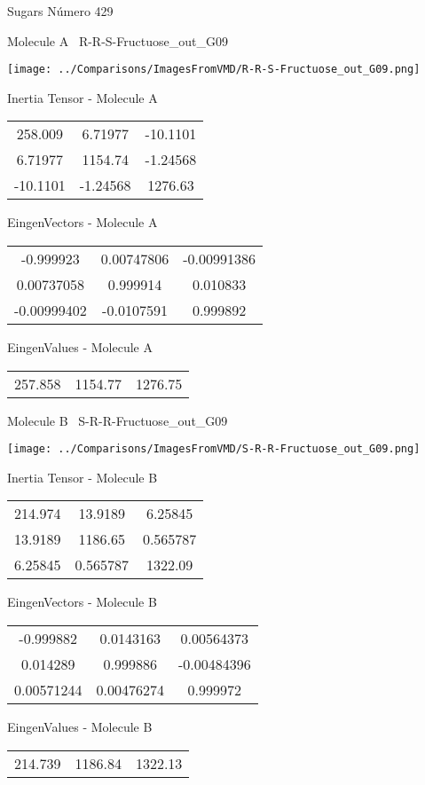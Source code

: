 \vtab[-3cm]
\begin{center}
{\large Sugars \tab Número 429}
\end{center}
\begin{multicols}{2}
\begin{center}

Molecule A \
R-R-S-Fructuose\_out\_G09

\texttt{[image: ../Comparisons/ImagesFromVMD/R-R-S-Fructuose\_out\_G09.png]}

Inertia Tensor - Molecule A \\
\begin{tabular}{|c c c|}
258.009	 & 	6.71977	 & 	-10.1101	 \\
6.71977	 & 	1154.74	 & 	-1.24568	 \\
-10.1101	 & 	-1.24568	 & 	1276.63
\end{tabular}

\vtab
 EingenVectors - Molecule A     \\
\begin{tabular}{|c c c|}
-0.999923	 & 	0.00747806	 & 	-0.00991386	 \\
0.00737058	 & 	0.999914	 & 	0.010833	 \\
-0.00999402	 & 	-0.0107591	 & 	0.999892
\end{tabular}

\vtab
 EingenValues - Molecule A     \\
\begin{tabular}{|c c c|}
257.858	 & 	1154.77	 & 	1276.75	 \\
\end{tabular}
\columnbreak

Molecule B \
S-R-R-Fructuose\_out\_G09

\texttt{[image: ../Comparisons/ImagesFromVMD/S-R-R-Fructuose\_out\_G09.png]}

Inertia Tensor - Molecule B \\
\begin{tabular}{|c c c|}
214.974	 & 	13.9189	 & 	6.25845	 \\
13.9189	 & 	1186.65	 & 	0.565787	 \\
6.25845	 & 	0.565787	 & 	1322.09
\end{tabular}

\vtab
 EingenVectors - Molecule B     \\
\begin{tabular}{|c c c|}
-0.999882	 & 	0.0143163	 & 	0.00564373	 \\
0.014289	 & 	0.999886	 & 	-0.00484396	 \\
0.00571244	 & 	0.00476274	 & 	0.999972
\end{tabular}

\vtab
 EingenValues - Molecule B     \\
\begin{tabular}{|c c c|}
214.739	 & 	1186.84	 & 	1322.13	 \\
\end{tabular}

\end{center}
\end{multicols}

